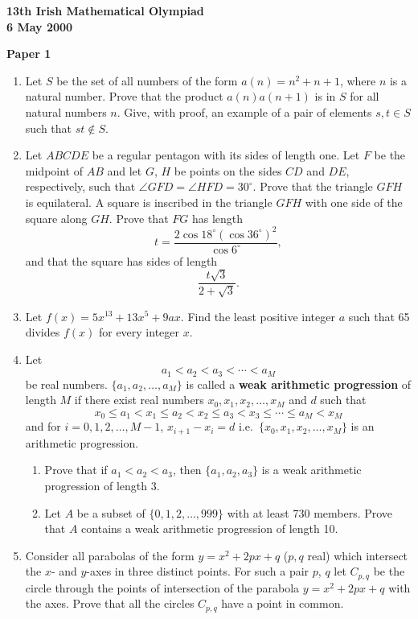 \documentclass[12pt]{article}
\begin{document}
\begin{center}
{\large\bfseries 13th Irish Mathematical Olympiad\\6 May 2000}
\end{center}
\bigskip\noindent\textbf{Paper 1}\bigskip
\begin{enumerate}
\item Let $S$ be the set of all numbers of the form $a(n) = n^2 + n + 1$, where $n$ is a natural number. Prove that the product $a(n)a(n+1)$ is in $S$ for all natural numbers $n$. Give, with proof, an example of a pair of elements $s, t \in S$ such that $st \notin S$.

\item Let $ABCDE$ be a regular pentagon with its sides of length one. Let $F$ be the midpoint of $AB$ and let $G$, $H$ be points on the sides $CD$ and $DE$, respectively, such that $\angle GFD = \angle HFD = 30^\circ$. Prove that the triangle $GFH$ is equilateral. A square is inscribed in the triangle $GFH$ with one side of the square along $GH$. Prove that $FG$ has length
\[
t = \frac{2\cos 18^\circ (\cos 36^\circ)^2}{\cos 6^\circ},
\]
and that the square has sides of length
\[
\frac{t\sqrt{3}}{2 + \sqrt{3}}.
\]

\item Let $f(x) = 5x^{13} + 13x^5 + 9ax$. Find the least positive integer $a$ such that 65 divides $f(x)$ for every integer $x$.

\item Let
\[
a_1 < a_2 < a_3 < \cdots < a_M
\]
be real numbers. $\{a_1, a_2, \ldots, a_M\}$ is called a \textbf{weak arithmetic progression} of length $M$ if there exist real numbers $x_0, x_1, x_2, \ldots, x_M$ and $d$ such that
\[
x_0 \leq a_1 < x_1 \leq a_2 < x_2 \leq a_3 < x_3 \leq \cdots \leq a_M < x_M
\]
and for $i = 0, 1, 2, \ldots, M-1$, $x_{i+1} - x_i = d$ i.e.\ $\{x_0, x_1, x_2, \ldots, x_M\}$ is an arithmetic progression.
\begin{enumerate}
\item[(a)] Prove that if $a_1 < a_2 < a_3$, then $\{a_1, a_2, a_3\}$ is a weak arithmetic progression of length 3.
\item[(b)] Let $A$ be a subset of $\{0, 1, 2, \ldots, 999\}$ with at least 730 members. Prove that $A$ contains a weak arithmetic progression of length 10.
\end{enumerate}

\item Consider all parabolas of the form $y = x^2 + 2px + q$ ($p, q$ real) which intersect the $x$- and $y$-axes in three distinct points. For such a pair $p$, $q$ let $C_{p,q}$ be the circle through the points of intersection of the parabola $y = x^2 + 2px + q$ with the axes. Prove that all the circles $C_{p,q}$ have a point in common.

\end{enumerate}
\end{document}

